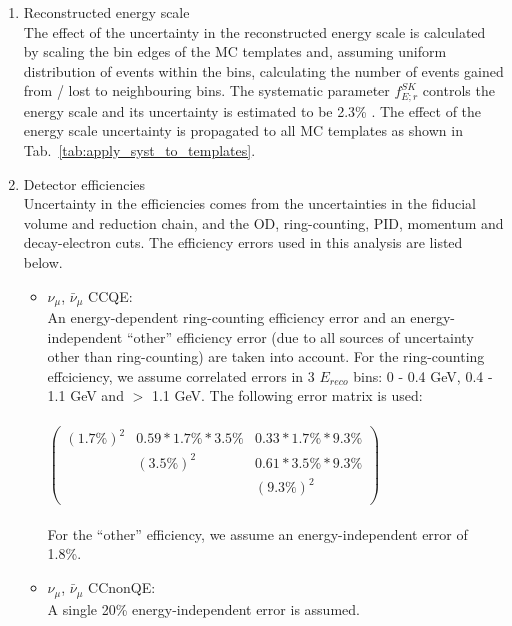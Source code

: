 \begin{enumerate}
\item Reconstructed energy scale\\ 
  The effect of the uncertainty in the reconstructed energy scale is calculated 
  by scaling the bin edges of the MC templates and,
  assuming uniform distribution of events within the bins, 
  calculating the number of events gained from / lost to neighbouring bins.
  The systematic parameter $f_{E; r}^{SK}$ controls the energy scale
  and its uncertainty is estimated to be 2.3\% \cite{SuperkErrors}.
  The effect of the energy scale uncertainty is propagated to all MC templates as shown in Tab.\ \ref{tab:apply_syst_to_templates}.\\
\item Detector efficiencies\\ 
  Uncertainty in the efficiencies comes from the uncertainties in the fiducial volume and reduction chain, 
  and the OD, ring-counting, PID, momentum and decay-electron cuts.
  The efficiency errors used in this analysis \cite{SuperkErrors} are listed below.
  \begin{itemize}
  \item $\nu_\mu$, $\bar{\nu}_{\mu}$ CCQE:\\
    An energy-dependent ring-counting efficiency error and an 
    energy-independent ``other'' efficiency error (due to all sources of uncertainty other than ring-counting)
    are taken into account.
    For the ring-counting effciciency, we assume correlated errors in 3 $E_{reco}$ bins: 0 - 0.4 GeV, 0.4 - 1.1 GeV and $>$ 1.1 GeV.
    The following error matrix is used:\\
    \\
    $
     \left(
        {\begin{array}{ccc}
           (1.7\%)^2  &   0.59 * 1.7\% * 3.5\%  &  0.33 * 1.7\% * 9.3\% \\
                      &   (3.5\%)^2             &  0.61 * 3.5\% * 9.3\% \\
                      &                         &  (9.3\%)^2            \\
         \end{array} }
     \right)
    $\\
    \\
    For the ``other'' efficiency, we assume an energy-independent error of 1.8\%.
  \item $\nu_\mu$, $\bar{\nu}_{\mu}$ CCnonQE:\\
        A single 20\% energy-independent error is assumed.

\end{itemize}
\end{enumerate}
